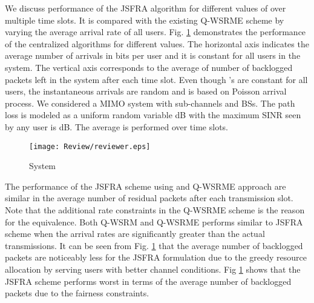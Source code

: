 
We discuss performance of the \ac{JSFRA} algorithm for different values of  over multiple time slots. It is compared with the existing \ac{Q-WSRME} scheme by varying the average arrival rate  of all users. Fig. \ref{fig-review} demonstrates the performance of the centralized algorithms for different  values. The horizontal axis indicates the average number of arrivals  in bits per user and it is constant for all users in the system. The vertical axis corresponds to the average of number of backlogged packets left in the system after each time slot. Even though 's are constant for all users, the instantaneous arrivals are random and is based on Poisson arrival process. We considered a  \ac{MIMO} system with  sub-channels and  \acp{BS}. The path loss is modeled as a uniform random variable \me{[0,-3]} dB with the maximum \ac{SINR} seen by any user is  dB. The average is performed over  time slots.
\begin{figure}
\centering
\texttt{[image: Review/reviewer.eps]}
\label{fig-review}
\caption{System }
\end{figure}

The performance of the \ac{JSFRA} scheme using  and \ac{Q-WSRME} approach are similar in the average number of residual packets after each transmission slot. Note that the additional rate constraints in the \ac{Q-WSRME} scheme is the reason for the equivalence. Both \ac{Q-WSRM} and \ac{Q-WSRME} performs similar to  \ac{JSFRA} scheme when the arrival rates are significantly greater than the actual transmissions. It can be seen from Fig. \ref{fig-review} that the average number of backlogged packets are noticeably less for the  \ac{JSFRA} formulation due to the greedy resource allocation by serving users with better channel conditions. Fig \ref{fig-review} shows that the \me{\ell_{\infty}} \ac{JSFRA} scheme performs worst in terms of the average number of backlogged packets due to the fairness constraints.